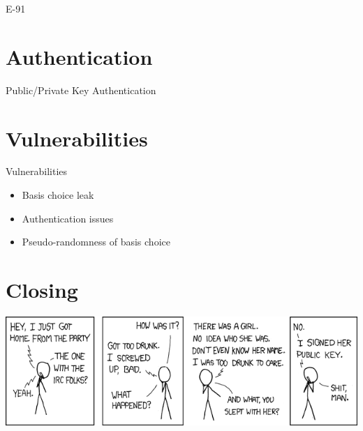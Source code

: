 \documentclass{beamer}
\begin{document}
	\begin{frame}{E-91} %

	\end{frame}

	\section{Authentication}

	\begin{frame}{Public/Private Key Authentication} %

	\end{frame}

	\section{Vulnerabilities}

	\begin{frame}{Vulnerabilities} %
		\begin{itemize}
			\item Basis choice leak							
			\item Authentication issues
			\item Pseudo-randomness of basis choice
		\end{itemize}
	\end{frame}

	\section{Closing}

	\begin{frame}
		\begin{center}
		\includegraphics[width=\textwidth]{images/xkcd-responsible_behavior}
		\end{center}
	\end{frame}


	\begin{frame}[plain]\end{frame}
\end{document}
